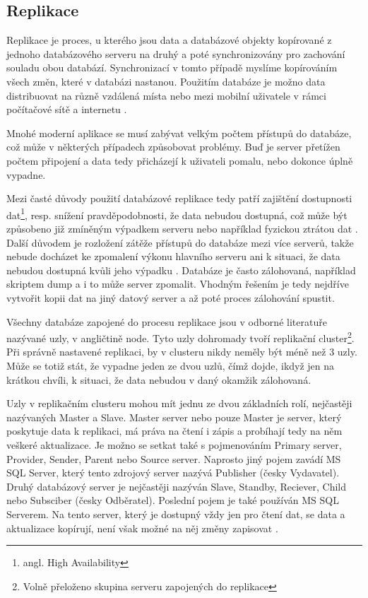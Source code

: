         \subsection{Replikace}
Replikace je proces, u kterého jsou data a databázové objekty kopírované z jednoho databázového serveru na druhý a poté synchronizovány pro zachování souladu obou databází. Synchronizací v tomto případě myslíme kopírováním všech změn, které v databázi nastanou. Použitím databáze je možno data distribuovat na různě vzdálená místa nebo mezi mobilní uživatele v rámci počítačové sítě a internetu \citep{Microsoft2013}.

Mnohé moderní aplikace se musí zabývat velkým počtem přístupů do databáze, což může v některých případech způsobovat problémy. Buď je server přetížen počtem připojení a data tedy přicházejí k uživateli pomalu, nebo dokonce úplně vypadne. 

Mezi časté důvody použití databázové replikace tedy patří zajištění dostupnosti dat\footnote{angl. High Availability}, resp. snížení pravděpodobnosti, že data nebudou dostupná, což může být způsobeno již zmíněným výpadkem serveru nebo například fyzickou ztrátou dat \citep{ObeHsu2012}. Další důvodem je rozložení zátěže přístupů do databáze mezi více serverů, takže nebude docházet ke zpomalení výkonu hlavního serveru ani k situaci, že data nebudou dostupná kvůli jeho výpadku \citep{BellKindahlThalmann2010}. Databáze je často zálohovaná, například skriptem dump a i to může server zpomalit. Vhodným řešením je tedy nejdříve vytvořit kopii dat na jiný datový server a až poté proces zálohování spustit. 

Všechny databáze zapojené do procesu replikace jsou v odborné literatuře nazývané uzly, v angličtině node. Tyto uzly dohromady tvoří replikační cluster\footnote{Volně přeloženo skupina serveru zapojených do replikace}. Při správně nastavené replikaci, by v clusteru nikdy neměly být méně než 3 uzly. Může se totiž stát, že vypadne jeden ze dvou uzlů, čímž dojde, ikdyž jen na krátkou chvíli, k situaci, že data nebudou v daný okamžik zálohovaná. 

Uzly v replikačním clusteru mohou mít jednu ze dvou základních rolí, nejčastěji nazývaných Master a Slave. Master server nebo pouze Master je server, který poskytuje data k replikaci, má práva na čtení i zápis a probíhají tedy na něm veškeré aktualizace. Je možno se setkat také s pojmenováním Primary server, Provider, Sender, Parent nebo Source server. Naprosto jiný pojem zavádí MS SQL Server, který tento zdrojový server nazývá Publisher (česky Vydavatel). Druhý databázový server je nejčastěji nazýván Slave, Standby, Reciever, Child nebo Subsciber (česky Odběratel). Poslední pojem je také používán MS SQL Serverem. Na tento server, který je dostupný vždy jen pro čtení dat, se data a aktualizace kopírují, není však možné na něj změny zapisovat \citep{RiggsKrossing2010}.

